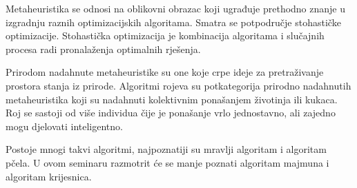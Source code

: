 Metaheuristika se odnosi na oblikovni obrazac koji ugrađuje prethodno znanje u izgradnju raznih optimizacijskih algoritama. Smatra se potpodručje stohastičke optimizacije. Stohastička optimizacija je kombinacija algoritama i slučajnih procesa radi pronalaženja optimalnih rješenja. 

Prirodom nadahnute metaheuristike su one koje crpe ideje za pretraživanje prostora stanja iz prirode. Algoritmi rojeva su potkategorija prirodno nadahnutih metaheuristika koji su nadahnuti kolektivnim ponašanjem životinja ili kukaca. Roj se sastoji od više individua čije je ponašanje vrlo jednostavno, ali zajedno mogu djelovati inteligentno. 

Postoje mnogi takvi algoritmi, najpoznatiji su mravlji algoritam i algoritam pčela. U ovom seminaru razmotrit će se manje poznati algoritam majmuna i algoritam krijesnica.